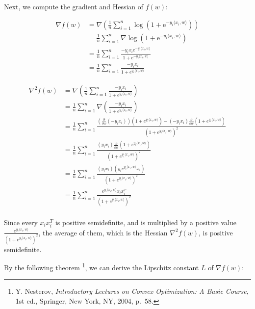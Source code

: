 \documentclass{article}
\begin{document}
Next, we compute the gradient and Hessian of $f(w)$:

\begin{align*}
    \nabla f(w) 
    &= \nabla \left( \frac{1}{n} \sum_{i = 1}^n \log \left( 1 + \mathrm{e}^{- y_i \langle x_i, w \rangle} \right) \right) \\
    &= \frac{1}{n} \sum_{i = 1}^n \nabla \log \left( 1 + \mathrm{e}^{- y_i \langle x_i, w \rangle} \right) \\
    &= \frac{1}{n} \sum_{i = 1}^n \frac{-y_i x_i e^{-y_i \langle x_i, w \rangle}}{1 + e^{-y_i \langle x_i, w \rangle}} \\
    &= \frac{1}{n} \sum_{i = 1}^n \frac{-y_i x_i}{1 + e^{y_i \langle x_i, w \rangle}}
\end{align*}

\begin{align*}
    \nabla^2 f(w) 
    &= \nabla \left( \frac{1}{n} \sum_{i = 1}^n \frac{-y_i x_i}{1 + e^{y_i \langle x_i, w \rangle}} \right) \\
    &= \frac{1}{n} \sum_{i = 1}^n \nabla \left( \frac{-y_i x_i}{1 + e^{y_i \langle x_i, w \rangle}} \right) \\
    &= \frac{1}{n} \sum_{i = 1}^n \frac{ \left( \frac{\partial}{\partial w} \left( -y_i x_i \right) \right) \left( 1 + e^{y_i \langle x_i, w \rangle} \right) - \left( -y_i x_i \right) \frac{\partial}{\partial w} \left( 1 + e^{y_i \langle x_i, w \rangle} \right) }{\left( 1 + e^{y_i \langle x_i, w \rangle} \right)^2} \\
    &= \frac{1}{n} \sum_{i = 1}^n \frac{ \left( y_i x_i \right) \frac{\partial}{\partial w} \left( 1 + e^{y_i \langle x_i, w \rangle} \right) }{\left( 1 + e^{y_i \langle x_i, w \rangle} \right)^2} \\
    &= \frac{1}{n} \sum_{i = 1}^n \frac{ \left( y_i x_i \right) \left( y_i e^{y_i \langle x_i, w \rangle} x_i \right) }{\left( 1 + e^{y_i \langle x_i, w \rangle} \right)^2} \\
    &= \frac{1}{n} \sum_{i = 1}^n \frac{ e^{y_i \langle x_i, w \rangle} x_i x_i^T }{\left( 1 + e^{y_i \langle x_i, w \rangle} \right)^2} \\
\end{align*}

Since every $x_i x_i^T$ is positive semidefinite, and is multiplied by a positive value $\frac{e^{y_i \langle x_i, w \rangle}}{(1 + e^{y_i \langle x_i, w \rangle})^2}$, the average of them, which is the Hessian $\nabla^2 f(w)$, is positive semidefinite.
\bigskip

By the following theorem
\footnote{Y. Nesterov, \textit{Introductory Lectures on Convex Optimization: A Basic Course}, 1st ed., Springer, New York, NY, 2004, p.~58.},
we can derive the Lipschitz constant $L$ of $\nabla f(w)$:
\end{document}
